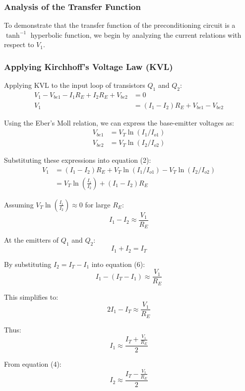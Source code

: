 \documentclass[a4paper,9pt,twoside,openany,twocolumn]{memoir}
\begin{document}
\subsubsection{Analysis of the Transfer Function}

To demonstrate that the transfer function of the preconditioning circuit is a \(\tanh^{-1}\) hyperbolic function, we begin by analyzing the current relations with respect to \( V_1 \).

\subsubsection{Applying Kirchhoff's Voltage Law (KVL)}

Applying KVL to the input loop of transistors \( Q_1 \) and \( Q_2 \):
\begin{align*}
V_1 - V_{be1} - I_1 R_E + I_2 R_E + V_{be2} &= 0 \tag{1} \\
V_1 &= (I_1 - I_2) R_E + V_{be1} - V_{be2} \tag{2}
\end{align*}

Using the Eber's Moll relation, we can express the base-emitter voltages as:
\begin{align*}
V_{be1} &= V_T \ln(I_1/I_{o1}) \tag{3} \\
V_{be2} &= V_T \ln(I_2/I_{o2}) \tag{4}
\end{align*}

Substituting these expressions into equation (2):
\begin{align*}
V_1 &= (I_1 - I_2) R_E + V_T \ln(I_1/I_{o1}) - V_T \ln(I_2/I_{o2}) \\
&= V_T \ln\left(\frac{I_1}{I_2}\right) + (I_1 - I_2) R_E \tag{5}
\end{align*}

Assuming \( V_T \ln\left(\frac{I_1}{I_2}\right) \approx 0 \) for large \( R_E \):
\[
I_1 - I_2 \approx \frac{V_1}{R_E} \tag{6}
\]

At the emitters of \( Q_1 \) and \( Q_2 \):
\begin{equation}
I_1 + I_2 = I_T \tag{7}
\end{equation}

By substituting \( I_2 = I_T - I_1 \) into equation (6):
\[
I_1 - (I_T - I_1) \approx \frac{V_1}{R_E}
\]

This simplifies to:
\[
2I_1 - I_T \approx \frac{V_1}{R_E} \tag{8}
\]

Thus:
\[
I_1 \approx \frac{I_T + \frac{V_1}{R_E}}{2} \tag{9}
\]

From equation (4):
\[
I_2 \approx \frac{I_T - \frac{V_1}{R_E}}{2} \tag{10}
\]
\end{document}
